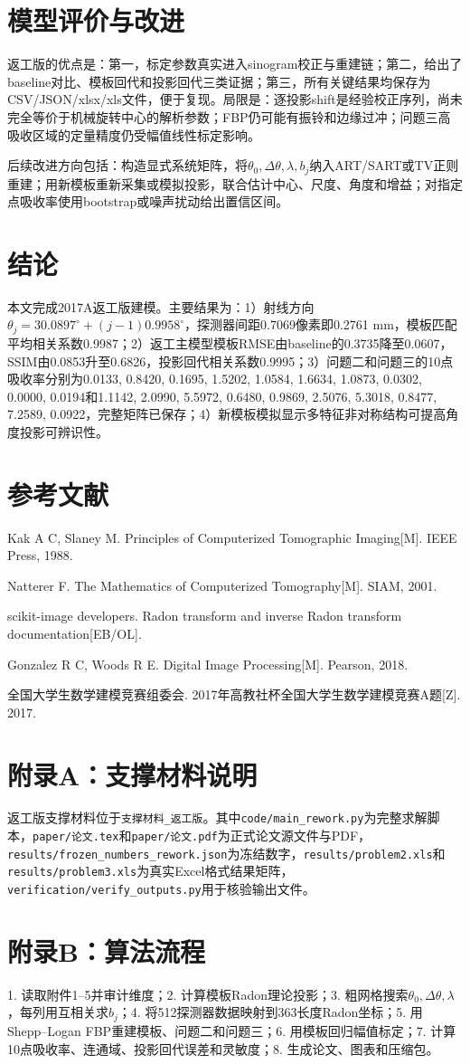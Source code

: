 \documentclass[UTF8,a4paper,12pt]{ctexart}
\begin{document}
\section{模型评价与改进}
返工版的优点是：第一，标定参数真实进入sinogram校正与重建链；第二，给出了baseline对比、模板回代和投影回代三类证据；第三，所有关键结果均保存为CSV/JSON/xlsx/xls文件，便于复现。局限是：逐投影shift是经验校正序列，尚未完全等价于机械旋转中心的解析参数；FBP仍可能有振铃和边缘过冲；问题三高吸收区域的定量精度仍受幅值线性标定影响。

后续改进方向包括：构造显式系统矩阵，将\(\theta_0,\Delta\theta,\lambda,b_j\)纳入ART/SART或TV正则重建；用新模板重新采集或模拟投影，联合估计中心、尺度、角度和增益；对指定点吸收率使用bootstrap或噪声扰动给出置信区间。

\section{结论}
本文完成2017A返工版建模。主要结果为：1）射线方向\(\theta_j=30.0897^\circ+(j-1)0.9958^\circ\)，探测器间距0.7069像素即0.2761 mm，模板匹配平均相关系数0.9987；2）返工主模型模板RMSE由baseline的0.3735降至0.0607，SSIM由0.0853升至0.6826，投影回代相关系数0.9995；3）问题二和问题三的10点吸收率分别为0.0133, 0.8420, 0.1695, 1.5202, 1.0584, 1.6634, 1.0873, 0.0302, 0.0000, 0.0194和1.1142, 2.0990, 5.5972, 0.6480, 0.9869, 2.5076, 5.3018, 0.8477, 7.2589, 0.0922，完整矩阵已保存；4）新模板模拟显示多特征非对称结构可提高角度投影可辨识性。

\clearpage
\section*{参考文献}
\begin{enumerate}[label={[\arabic*]}]
\item Kak A C, Slaney M. Principles of Computerized Tomographic Imaging[M]. IEEE Press, 1988.
\item Natterer F. The Mathematics of Computerized Tomography[M]. SIAM, 2001.
\item scikit-image developers. Radon transform and inverse Radon transform documentation[EB/OL].
\item Gonzalez R C, Woods R E. Digital Image Processing[M]. Pearson, 2018.
\item 全国大学生数学建模竞赛组委会. 2017年高教社杯全国大学生数学建模竞赛A题[Z]. 2017.
\end{enumerate}

\appendix
\section{附录A：支撑材料说明}
返工版支撑材料位于\texttt{支撑材料\_返工版}。其中\texttt{code/main\_rework.py}为完整求解脚本，\texttt{paper/论文.tex}和\texttt{paper/论文.pdf}为正式论文源文件与PDF，\texttt{results/frozen\_numbers\_rework.json}为冻结数字，\texttt{results/problem2.xls}和\texttt{results/problem3.xls}为真实Excel格式结果矩阵，\texttt{verification/verify\_outputs.py}用于核验输出文件。

\section{附录B：算法流程}
1. 读取附件1--5并审计维度；2. 计算模板Radon理论投影；3. 粗网格搜索\(\theta_0,\Delta\theta,\lambda\)，每列用互相关求\(b_j\)；4. 将512探测器数据映射到363长度Radon坐标；5. 用Shepp--Logan FBP重建模板、问题二和问题三；6. 用模板回归幅值标定；7. 计算10点吸收率、连通域、投影回代误差和灵敏度；8. 生成论文、图表和压缩包。
\end{document}
